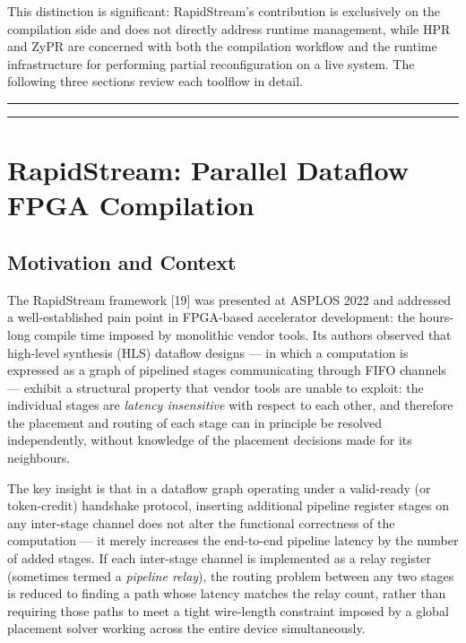 This distinction is significant: RapidStream's contribution is exclusively on the compilation side and does not directly address runtime management, while HPR and ZyPR are concerned with both the compilation workflow and the runtime infrastructure for performing partial reconfiguration on a live system. The following three sections review each toolflow in detail.

\vspace{0.4em}\hrule\vspace{0.4em}

\vspace{0.4em}\hrule\vspace{0.4em}

\section{RapidStream: Parallel Dataflow FPGA Compilation}

\subsection{Motivation and Context}

The RapidStream framework [19] was presented at ASPLOS 2022 and addressed a well-established pain point in FPGA-based accelerator development: the hours-long compile time imposed by monolithic vendor tools. Its authors observed that high-level synthesis (HLS) dataflow designs — in which a computation is expressed as a graph of pipelined stages communicating through FIFO channels — exhibit a structural property that vendor tools are unable to exploit: the individual stages are \textit{latency insensitive} with respect to each other, and therefore the placement and routing of each stage can in principle be resolved independently, without knowledge of the placement decisions made for its neighbours.

The key insight is that in a dataflow graph operating under a valid-ready (or token-credit) handshake protocol, inserting additional pipeline register stages on any inter-stage channel does not alter the functional correctness of the computation — it merely increases the end-to-end pipeline latency by the number of added stages. If each inter-stage channel is implemented as a relay register (sometimes termed a \textit{pipeline relay}), the routing problem between any two stages is reduced to finding a path whose latency matches the relay count, rather than requiring those paths to meet a tight wire-length constraint imposed by a global placement solver working across the entire device simultaneously.

